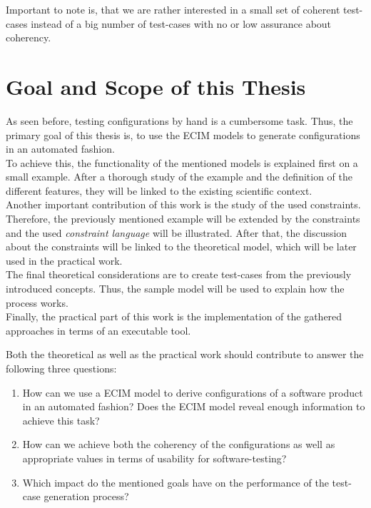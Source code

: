 Important to note is, that we are rather interested in a small set of coherent test-cases instead of a big number of test-cases with no or low assurance about coherency.


\section{Goal and Scope of this Thesis}\label{sec:scope}

As seen before, testing configurations by hand is a cumbersome task. Thus, the primary goal of this thesis is, to use the ECIM models to generate configurations in an automated fashion. \\

To achieve this, the functionality of the mentioned models is explained first on a small example. After a thorough study of the example and the definition of the different features, they will be linked to the existing scientific context. \\

Another important contribution of this work is the study of the used constraints. Therefore, the previously mentioned example will be extended by the constraints and the used \emph{constraint language} will be illustrated. After that, the discussion about the constraints will be linked to the theoretical model, which will be later used in the practical work.\\

The final theoretical considerations are to create test-cases from the previously introduced concepts. Thus, the sample model will be used to explain how the process works. \\

Finally, the practical part of this work is the implementation of the gathered approaches in terms of an executable tool. 

Both the theoretical as well as the practical work should contribute to answer the following three questions:

\begin{enumerate}
 \item How can we use a ECIM model to derive configurations of a software product in an automated fashion? Does the ECIM model reveal enough information to achieve this task?
 
 \item How can we achieve both the coherency of the configurations as well as appropriate values in terms of usability for software-testing?

 \item Which impact do the mentioned goals have on the performance of the test-case generation process?
\end{enumerate}


